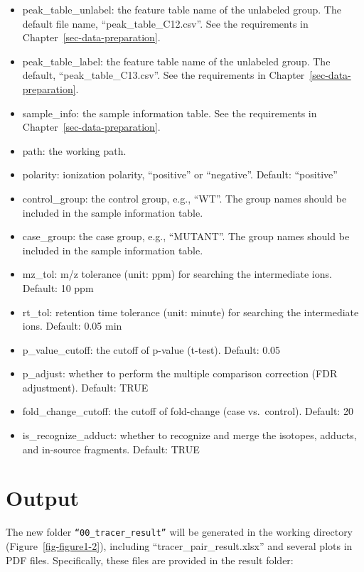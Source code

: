 \documentclass[
  letterpaper,
  DIV=11,
  numbers=noendperiod]{scrreprt}
\providecommand{\tightlist}{%
  \setlength{\itemsep}{0pt}\setlength{\parskip}{0pt}}
\begin{document}
\begin{itemize}
\tightlist
\item
  peak\_table\_unlabel: the feature table name of the unlabeled group.
  The default file name, ``peak\_table\_C12.csv''. See the requirements
  in Chapter~\ref{sec-data-preparation}.
\item
  peak\_table\_label: the feature table name of the unlabeled group. The
  default, ``peak\_table\_C13.csv''. See the requirements in
  Chapter~\ref{sec-data-preparation}.
\item
  sample\_info: the sample information table. See the requirements in
  Chapter~\ref{sec-data-preparation}.
\item
  path: the working path.
\item
  polarity: ionization polarity, ``positive'' or ``negative''. Default:
  ``positive''
\item
  control\_group: the control group, e.g., ``WT''. The group names
  should be included in the sample information table.
\item
  case\_group: the case group, e.g., ``MUTANT''. The group names should
  be included in the sample information table.
\item
  mz\_tol: m/z tolerance (unit: ppm) for searching the intermediate
  ions. Default: 10 ppm
\item
  rt\_tol: retention time tolerance (unit: minute) for searching the
  intermediate ions. Default: 0.05 min
\item
  p\_value\_cutoff: the cutoff of p-value (t-test). Default: 0.05
\item
  p\_adjust: whether to perform the multiple comparison correction (FDR
  adjustment). Default: TRUE
\item
  fold\_change\_cutoff: the cutoff of fold-change (case vs.~control).
  Default: 20
\item
  is\_recognize\_adduct: whether to recognize and merge the isotopes,
  adducts, and in-source fragments. Default: TRUE
\end{itemize}

\section{Output}\label{sec-isoPairFinder-output}

The new folder \texttt{“00\_tracer\_result”} will be generated in the
working directory (Figure~\ref{fig-figure1-2}), including
``tracer\_pair\_result.xlsx'' and several plots in PDF files.
Specifically, these files are provided in the result folder:
\end{document}
